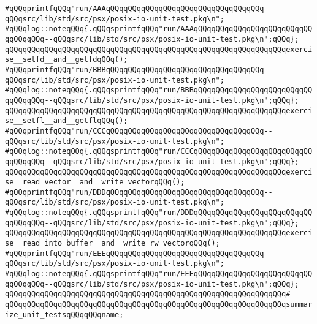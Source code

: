 \verb|#qQQqprintfqQQq"run/AAAqQQqqQQqqQQqqQQqqQQqqQQqqQQqqQQqqQQq--qQQqsrc/lib/std/src/psx/posix-io-unit-test.pkg\n";|\newline
\verb|#qQQqlog::noteqQQq{.qQQqsprintfqQQq"run/AAAqQQqqQQqqQQqqQQqqQQqqQQqqQQqqQQqqQQq--qQQqsrc/lib/std/src/psx/posix-io-unit-test.pkg\n";qQQq};|\newline
\verb|qQQqqQQqqQQqqQQqqQQqqQQqqQQqqQQqqQQqqQQqqQQqqQQqqQQqqQQqqQQqqQQqexercise__setfd__and__getfdqQQq();|\newline
\verb|#qQQqprintfqQQq"run/BBBqQQqqQQqqQQqqQQqqQQqqQQqqQQqqQQqqQQq--qQQqsrc/lib/std/src/psx/posix-io-unit-test.pkg\n";|\newline
\verb|#qQQqlog::noteqQQq{.qQQqsprintfqQQq"run/BBBqQQqqQQqqQQqqQQqqQQqqQQqqQQqqQQqqQQq--qQQqsrc/lib/std/src/psx/posix-io-unit-test.pkg\n";qQQq};|\newline
\verb|qQQqqQQqqQQqqQQqqQQqqQQqqQQqqQQqqQQqqQQqqQQqqQQqqQQqqQQqqQQqqQQqexercise__setfl__and__getflqQQq();|\newline
\verb|#qQQqprintfqQQq"run/CCCqQQqqQQqqQQqqQQqqQQqqQQqqQQqqQQqqQQq--qQQqsrc/lib/std/src/psx/posix-io-unit-test.pkg\n";|\newline
\verb|#qQQqlog::noteqQQq{.qQQqsprintfqQQq"run/CCCqQQqqQQqqQQqqQQqqQQqqQQqqQQqqQQqqQQq--qQQqsrc/lib/std/src/psx/posix-io-unit-test.pkg\n";qQQq};|\newline
\verb|qQQqqQQqqQQqqQQqqQQqqQQqqQQqqQQqqQQqqQQqqQQqqQQqqQQqqQQqqQQqqQQqexercise__read_vector__and__write_vectorqQQq();|\newline
\verb|#qQQqprintfqQQq"run/DDDqQQqqQQqqQQqqQQqqQQqqQQqqQQqqQQqqQQq--qQQqsrc/lib/std/src/psx/posix-io-unit-test.pkg\n";|\newline
\verb|#qQQqlog::noteqQQq{.qQQqsprintfqQQq"run/DDDqQQqqQQqqQQqqQQqqQQqqQQqqQQqqQQqqQQq--qQQqsrc/lib/std/src/psx/posix-io-unit-test.pkg\n";qQQq};|\newline
\verb|qQQqqQQqqQQqqQQqqQQqqQQqqQQqqQQqqQQqqQQqqQQqqQQqqQQqqQQqqQQqqQQqexercise__read_into_buffer__and__write_rw_vectorqQQq();|\newline
\verb|#qQQqprintfqQQq"run/EEEqQQqqQQqqQQqqQQqqQQqqQQqqQQqqQQqqQQq--qQQqsrc/lib/std/src/psx/posix-io-unit-test.pkg\n";|\newline
\verb|#qQQqlog::noteqQQq{.qQQqsprintfqQQq"run/EEEqQQqqQQqqQQqqQQqqQQqqQQqqQQqqQQqqQQq--qQQqsrc/lib/std/src/psx/posix-io-unit-test.pkg\n";qQQq};|\newline
\verb|qQQqqQQqqQQqqQQqqQQqqQQqqQQqqQQqqQQqqQQqqQQqqQQqqQQqqQQqqQQqqQQq#|\newline
\verb|qQQqqQQqqQQqqQQqqQQqqQQqqQQqqQQqqQQqqQQqqQQqqQQqqQQqqQQqqQQqqQQqsummarize_unit_testsqQQqqQQqname;|\newline
